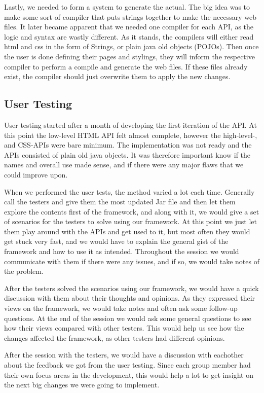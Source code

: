 \documentclass[12pt]{article}
\begin{document}
    Lastly, we needed to form a system to generate the actual. The big idea was to make some sort of compiler that puts strings together to make the necessary web files. It later became apparent that we needed one compiler for each API, as the logic and syntax are wastly different. As it stands, the compilers will either read html and css in the form of Strings, or plain java old objects (POJOs). Then once the user is done defining their pages and stylings, they will inform the respective compiler to perform a compile and generate the web files. If these files already exist, the compiler should just overwrite them to apply the new changes.


    \subsection{User Testing}
    
    User testing started after a month of developing the first iteration of the API. At this point the low-level HTML API felt almost complete, however the high-level-, and CSS-APIs were bare minimum. The implementation was not ready and the APIs consisted of plain old java objects. It was therefore important know if the names and overall use made sense, and if there were any major flaws that we could improve upon.

    When we performed the user tests, the method varied a lot each time. Generally call the testers and give them the most updated Jar file and then let them explore the contents first of the framework, and along with it, we would give a set of scenarios for the testers to solve using our framework. At this point we just let them play around with the APIs and get used to it, but most often they would get stuck very fast, and we would have to explain the general gist of the framework and how to use it as intended. Throughout the session we would communicate with them if there were any issues, and if so, we would take notes of the problem.

    After the testers solved the scenarios using our framework, we would have a quick discussion with them about their thoughts and opinions. As they expressed their views on the framework, we would take notes and often ask some follow-up questions. At the end of the session we would ask some general questions to see how their views compared with other testers. This would help us see how the changes affected the framework, as other testers had different opinions.

    After the session with the testers, we would have a discussion with eachother about the feedback we got from the user testing. Since each group member had their own focus areas in the development, this would help a lot to get insight on the next big changes we were going to implement. 
\end{document}
